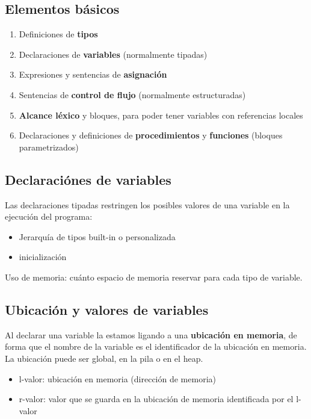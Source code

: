 \documentclass[10pt,a4paper]{report}
\begin{document}
\subsection{Elementos básicos}
  	
  	\begin{enumerate}
		\item Definiciones de \textbf{tipos}
		\item Declaraciones de \textbf{variables} (normalmente tipadas)		
 		\item Expresiones y sentencias de \textbf{asignación}
 		\item Sentencias de \textbf{control de flujo} (normalmente 
		estructuradas)
 		\item \textbf{Alcance léxico} y bloques, para poder tener variables 
 		con referencias locales
		\item Declaraciones y definiciones de \textbf{procedimientos} y 
		\textbf{funciones} (bloques parametrizados)
	\end{enumerate}
		
\subsection{Declaraciónes de variables}
		\par Las declaraciones tipadas restringen los posibles valores de una 
		variable en la ejecución del programa:
		\begin{itemize}
		\item Jerarquía de tipos built-in o personalizada
		\item inicialización
		\end{itemize}
		
		\par Uso de memoria: cuánto espacio de memoria reservar para cada
		tipo de variable.
		
\subsection{Ubicación y valores de variables}
		\par Al declarar una variable la estamos ligando a una 
		\textbf{ubicación en memoria}, de forma que el nombre de la variable 
		es el identificador de la ubicación en memoria. La ubicación puede ser 
		global, en la pila o en el heap.
		
		\begin{itemize}
		\item l-valor: ubicación en memoria (dirección de memoria)
		\item r-valor: valor que se guarda en la ubicación de memoria 
		identificada por el l-valor
		\end{itemize}
		
\end{document}
